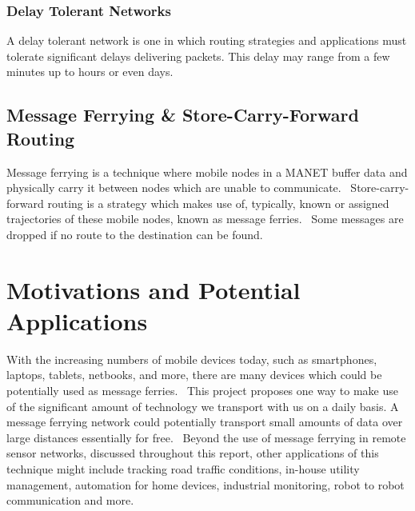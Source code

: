 \subsubsection{Delay Tolerant Networks}
\label{sec:delay_loss_tolerant}
A delay tolerant network is one in which routing strategies and applications must tolerate significant delays delivering packets.
This delay may range from a few minutes up to hours or even days.~\cite{Routing}


\subsection{Message Ferrying \& Store-Carry-Forward Routing}
\label{sec:ferrying_overview}
Message ferrying is a technique where mobile nodes in a MANET buffer data and physically carry it between nodes which are unable to communicate.~\cite{adhocmsgferry}
Store-carry-forward routing is a strategy which makes use of, typically, known or assigned trajectories of these mobile nodes, known as message ferries.~\cite{Routing}
Some messages are dropped if no route to the destination can be found.~\cite{implement}



\section{Motivations and Potential Applications}
\label{sec:motivations}

With the increasing numbers of mobile devices today, such as smartphones, laptops, tablets, netbooks, and more, there are many devices which could be potentially used as message ferries.~\cite{wearable} 
This project proposes one way to make use of the significant amount of technology we transport with us on a daily basis.
A message ferrying network could potentially transport small amounts of data over large distances essentially for free.~\cite{efficientrouting}
Beyond the use of message ferrying in remote sensor networks, discussed throughout this report, other applications of this technique might include tracking road traffic conditions, in-house utility management, automation for home devices, industrial monitoring, robot to robot communication and more.~\cite{book1}


